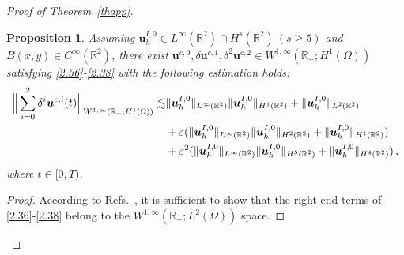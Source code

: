 \documentclass[pdflatex,sn-mathphys-num]{sn-jnl}%
\theoremstyle{thmstyleone}%
\newtheorem{proposition}[theorem]{Proposition}%
\theoremstyle{thmstyletwo}%
\theoremstyle{thmstylethree}%
\theoremstyle{thmstyletwo}
\begin{document}
\begin{proof}[Proof of Theorem~{\upshape\ref{thapp}}]
\begin{proposition}\label{propC}	
	Assuming ${\boldsymbol{u}}^{I,0}_{h}\in L^\infty(\mathbb{R}^2)\cap H^s(\mathbb{R}^2)~(s\geqslant5)$ and $B(x,y)\in C^\infty(\mathbb{R}^2)$, 
	there exist $\boldsymbol{u}^{c,0},\delta\boldsymbol{u}^{c,1},\delta^2\boldsymbol{u}^{c,2}\in W^{1,\infty}(\mathbb{R}_+;H^1(\Omega))$ satisfying \eqref{2.36}-\eqref{2.38}
	with the following estimation holds:
	\begin{align*} 
		\Big\lVert 
		\sum_{i=0}^{2}\delta^i\boldsymbol u^{c,i}
		(t)
		\Big\rVert_{W^{1,\infty}(\mathbb{R}_+;H^1(\Omega))}
		\lesssim&
		\lVert
		\boldsymbol{u}^{I,0}_h
		\rVert_{{L}^{\infty}(\mathbb{R}^2)}
		\lVert
		\boldsymbol{u}^{I,0}_h
		\rVert_{{H}^{1}(\mathbb{R}^2)}+ 
		\lVert
		\boldsymbol{u}^{I,0}_h
		\rVert_{{L}^{2}(\mathbb{R}^2)}\\
		&+\varepsilon
		(\lVert
		\boldsymbol{u}^{I,0}_h
		\rVert_{{L}^{\infty}(\mathbb{R}^2)}
		\lVert
		\boldsymbol{u}^{I,0}_h
		\rVert_{{H}^{2}(\mathbb{R}^2)}+ 
		\lVert
		\boldsymbol{u}^{I,0}_h
		\rVert_{{H}^{1}(\mathbb{R}^2)})
		\notag\\
		&
		+\varepsilon^2
		(\lVert
		\boldsymbol{u}^{I,0}_h
		\rVert_{{L}^{\infty}(\mathbb{R}^2)}
		\lVert
		\boldsymbol{u}^{I,0}_h
		\rVert_{{H}^{5}(\mathbb{R}^2)}+ 
		\lVert
		\boldsymbol{u}^{I,0}_h
		\rVert_{{H}^{4}(\mathbb{R}^2)})\,,
	\end{align*}
	where $t\in [0,T)$.
\end{proposition}
\begin{proof}
	According to Refs.~\cite{Galdi1994,Ukai1986},  it is sufficient to show that the right end terms of \eqref{2.36}-\eqref{2.38} belong to the $W^{1,\infty}(\mathbb{R}_+;L^2(\Omega))$ space.
	

\end{proof}
\end{proof}
\end{document}
